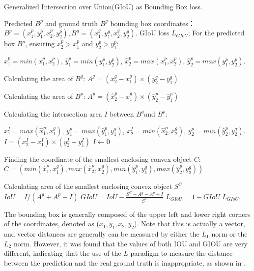 \begin{algorithm}[htb]
  \caption{ Generalized Intersection over Union(GIoU) as Bounding Box loss.}
  \label{alg:Framwork}
  \begin{algorithmic}[1]
    \Require
    Predicted $B^{p}$ and ground truth $B^{g}$ bounding box coordinates：
     $ B^{p}=\left ( x_{1}^{p},y_{1}^{p},x_{2}^{p},y_{2}^{p} \right ),B^{g}=\left ( x_{1}^{g},y_{1}^{g},x_{2}^{g},y_{2}^{g} \right ).$
    \Ensure
     GIoU loss $L_{GIoU}$;
    \State For the predicted box $B^{p}$, ensuring $x_{2}^{p} > x_{1}^{p}$ and $y_{2}^{p} > y_{1}^{p}$:
    
    $\hat{x}_{1}^{p}=min( x_{1}^{p},x_{2}^{p})$, $\hat{y}_{1}^{p}=min( y_{1}^{p},y_{2}^{p})$,
    $\hat{x}_{2}^{p}=max( x_{1}^{p},x_{2}^{p})$, $\hat{y}_{2}^{p}=max( y_{1}^{p},y_{2}^{p})$.

    
    \State Calculating the area of $B^{g}$:
    $A^{g}=(x_{2}^{g}-x_{1}^{g}) \times (y_{2}^{g}-y_{1}^{g})$
   
    \State  Calculating the area of $B^{p}$:
    $A^{p}=(\hat{x}_{2}^{p}-\hat{x}_{1}^{g}) \times (\hat{y}_{2}^{p}-\hat{y}_{1}^{p})$
    
    \State Calculating the intersection area $I$ between  $B^{g}$and  $B^{p}$:
    
    $x_{1}^{I}=max( \hat{x}_{1}^{p},x_{1}^{g})$, $y_{1}^{p}=max( \hat{y}_{1}^{p},y_{1}^{g})$,
    $x_{2}^{I}=min(\hat{x}_{2}^{p},x_{2}^{g})$, $y_{2}^{p}=min(\hat{y}_{2}^{p},y_{2}^{g})$.
      \State  $I= (x_{2}^{I}-x_{1}^{I}) \times (y_{2}^{I}-y_{1}^{I})$ 
    \Else
      \State $I \gets 0$
      
    \EndIf
    \State Finding the coordinate of the smallest enclosing convex object $C$:
      $ C=\left ( min( \hat{x}_{1}^{p},x_{1}^{g}), max(\hat{x}_{2}^{p},x_{2}^{g}),
      min( \hat{y}_{1}^{p},y_{1}^{g}), max(\hat{y}_{2}^{p},y_{2}^{g}) \right )$
    
    \State Calculating area of the smallest enclosing convex object $S^{C}$
    \State $IoU=I/( A^{g} + A^{p} - I)$
    \State $GIoU=  IoU -\frac{S^{C}-A^{g} - A^{p} + I}{S^{C}}$
    \State $L_{GIoU}=1-GIoU$
    \newline
    \Return $L_{GIoU}$.
  \end{algorithmic}
\end{algorithm}

The bounding box is generally composed of the upper left and lower right corners of the coordinates, denoted as ($x_{1}, y_{1}, x_{2}, y_{2}$). Note that this is actually a vector, and vector distances are generally can be measured by either the $ L_{1}$ norm or the $ L_{2}$ norm. However, it was found that the values of both IOU and GIOU are very different, indicating that the use of the $L$ paradigm to measure the distance between the prediction and the real ground truth is inappropriate, as shown in  \eg{}.



